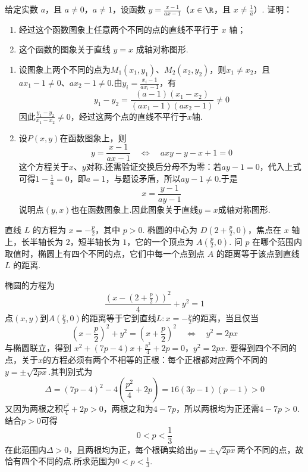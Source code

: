 \begin{problem}

给定实数 \(a\)，且 \(a \neq 0\)，\(a \neq 1\)，设函数 \(y = \frac{x - 1}{ax - 1}\)（\(x \in \R\)，且 \(x \neq \frac{1}{a}\)）. 证明：
\begin{enumerate}
\item 经过这个函数图象上任意两个不同的点的直线不平行于 \(x\) 轴；
\item 这个函数的图象关于直线 \(y = x\) 成轴对称图形.
\end{enumerate}
\end{problem}

\begin{solution}
\begin{enumerate}
\item 设图象上两个不同的点为\(M_1(x_1,y_1)\)、\(M_2(x_2,y_2)\)，则\(x_1\ne x_2\)，且\(ax_1-1\ne0\)、\(ax_2-1\ne0\).由\(y_i=\frac{x_i-1}{ax_i-1}\)，有
\[
y_1-y_2
=\frac{(a-1)(x_1-x_2)}{(ax_1-1)(ax_2-1)}\ne0
\]
因此\(\frac{y_1-y_2}{x_1-x_2}\ne0\)，经过这两个点的直线不平行于\(x\)轴.

\item 设\(P(x,y)\)在函数图象上，则
\[
y=\frac{x-1}{ax-1}
\quad\Longleftrightarrow\quad
axy-y-x+1=0
\]
这个方程关于\(x\)、\(y\)对称.还需验证交换后分母不为零：若\(ay-1=0\)，代入上式可得\(1-\frac1a=0\)，即\(a=1\)，与题设矛盾，所以\(ay-1\ne0\).于是
\[
x=\frac{y-1}{ay-1}
\]
说明点\((y,x)\)也在函数图象上.因此图象关于直线\(y=x\)成轴对称图形.
\end{enumerate}
\end{solution}

\begin{problem}

直线 \(L\) 的方程为 \(x = -\frac{p}{2}\)，其中 \(p > 0\). 椭圆的中心为 \(D\left(2+\frac{p}{2},0\right)\)，焦点在 \(x\) 轴上，长半轴长为 \(2\)，短半轴长为 \(1\)，它的一个顶点为 \(A\left(\frac{p}{2},0\right)\). 问 \(p\) 在哪个范围内取值时，椭圆上有四个不同的点，它们中每一个点到点 \(A\) 的距离等于该点到直线 \(L\) 的距离.
\end{problem}

\begin{solution}
椭圆的方程为
\[
\frac{\left(x-\left(2+\frac p2\right)\right)^2}{4}+y^2=1
\]
点\((x,y)\)到\(A\left(\frac p2,0\right)\)的距离等于它到直线\(L:x=-\frac p2\)的距离，当且仅当
\[
\left(x-\frac p2\right)^2+y^2=\left(x+\frac p2\right)^2
\quad\Longleftrightarrow\quad
y^2=2px
\]
与椭圆联立，得到
\(x^2+(7p-4)x+\frac{p^2}{4}+2p=0\)，\(y^2=2px\).
要得到四个不同的点，关于\(x\)的方程必须有两个不相等的正根：每个正根都对应两个不同的\(y=\pm\sqrt{2px}\).其判别式为
\[
\Delta=(7p-4)^2-4\left(\frac{p^2}{4}+2p\right)
=16(3p-1)(p-1)>0
\]
又因为两根之积\(\frac{p^2}{4}+2p>0\)，两根之和为\(4-7p\)，所以两根均为正还需\(4-7p>0\).结合\(p>0\)可得
\[
0<p<\frac13
\]
在此范围内\(\Delta>0\)，且两根均为正，每个根确实给出\(y=\pm\sqrt{2px}\)两个不同的点，故恰有四个不同的点.所求范围为\(0<p<\frac13\).
\end{solution}
